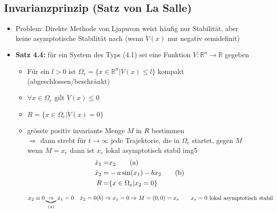 \documentclass[11pt,a4paper]{article}
\begin{document}
\subsection{Invarianzprinzip (Satz von La Salle)}
\begin{itemize}
\item Problem: Direkte Methode von Ljapuvon weist häufig nur Stabilität, aber keine asymptotische Stabilität nach (wenn $\dot V(x)$ nur negativ semidefinit)
\item \textbf{Satz 4.4:} für ein System des Typs (4.1) sei eine Funktion $V: \mathbb{R}^n \rightarrow \mathbb{R}$ gegeben
\begin{itemize}
\item Für ein $l > 0$ ist $\Omega_e = \{ x\in \mathbb{R}^n | V(x) \le l \}$ kompakt (abgeschlossen/beschränkt)
\item $\forall x \in \Omega_e$ gilt $\dot V(x) \le 0$
\item $R = \{ x\in \Omega_e | \dot V(x) = 0\}$
\item grösste positiv invariante Menge $M$ in $R$ bestimmen\\
$\Rightarrow$ dann strebt für $t\to \infty$ jede Trajektorie, die in $\Omega_e$ startet, gegen $M$ \\wenn $M= x_e$ dann ist $x_e$ lokal asymptotisch stabil img5
\begin{align}
\dot x_1 =& x_2\tag{a}\\
\dot x_2 =& -a \sin(x_1) - bx_2\tag{b}\\
R = &\{ x\in \Omega_e | x_2 = 0\}\notag\\
\end{align}
$ 
x_2 \equiv 0 \underbrace{\Rightarrow}_{(a)} \dot x_1 = 0 \quad \dot x_2 = 0\\
(b) \Rightarrow  x_1 = 0 \Rightarrow M = (0,0) = x_e \qquad x_e = 0 \text{ lokal asymptotisch stabil }
$
\end{itemize}
\end{itemize}
\end{document}
